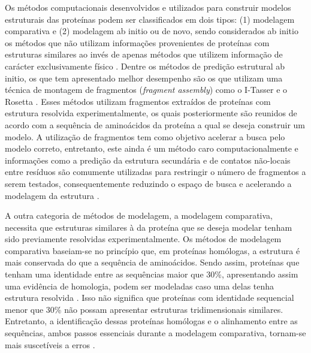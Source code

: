 Os métodos computacionais desenvolvidos e utilizados para construir modelos estruturais das proteínas podem ser classificados em dois tipos: (1) modelagem comparativa e (2) modelagem ab initio ou de novo, sendo considerados ab initio os métodos que não utilizam informações provenientes de proteínas com estruturas similares ao invés de apenas métodos que utilizem informação de carácter exclusivamente físico \cite{Helles:2003}. Dentre os métodos de predição estrutural ab initio, os que tem apresentado melhor desempenho são os que utilizam uma técnica de montagem de fragmentos (\textit{fragment assembly}) como o I-Tasser \cite{Zhang:2003} e o Rosetta \cite{Rohl:1999}. Esses métodos utilizam fragmentos extraídos de proteínas com estrutura resolvida experimentalmente, os quais posteriormente são reunidos de acordo com a sequência de aminoácidos da proteína a qual se deseja construir um modelo. A utilização de fragmentos tem como objetivo acelerar a busca pelo modelo correto, entretanto, este ainda é um método caro computacionalmente e informações como a predição da estrutura secundária e de contatos não-locais entre resíduos são comumente utilizadas para restringir o número de fragmentos a serem testados, consequentemente reduzindo o espaço de busca e acelerando a modelagem da estrutura \cite{Helles:2003}.

A outra categoria de métodos de modelagem, a modelagem comparativa, necessita que estruturas similares à da proteína que se deseja modelar tenham sido previamente resolvidas experimentalmente. Os métodos de modelagem comparativa baseiam-se no princípio que, em proteínas homólogas, a estrutura é mais conservada do que a sequência de aminoácidos. Sendo assim, proteínas que tenham uma identidade entre as sequências maior que 30\%, apresentando assim uma evidência de homologia, podem ser modeladas caso uma delas tenha estrutura resolvida \cite{Marti-Renom:1995}. Isso não significa que proteínas com identidade sequencial menor que 30\% não possam apresentar estruturas tridimensionais similares. Entretanto, a identificação dessas proteínas homólogas e o alinhamento entre as sequências, ambos passos essenciais durante a modelagem comparativa, tornam-se mais suscetíveis a erros \cite{Marti-Renom:1995}. 

